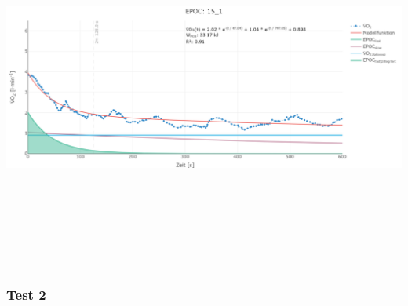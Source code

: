 \documentclass[
  letterpaper,
  DIV=11]{scrartcl}
\begin{document}
\includegraphics[width=11.45833in,height=4.6875in]{images/15_1.png}

\subsubsection{Test 2}
\end{document}
